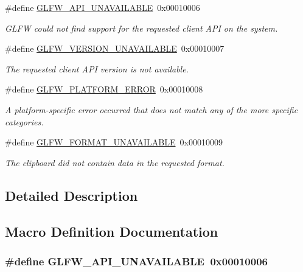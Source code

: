 \begin{DoxyCompactItemize}
\#define \hyperlink{group__errors_ga56882b290db23261cc6c053c40c2d08e}{G\-L\-F\-W\-\_\-\-A\-P\-I\-\_\-\-U\-N\-A\-V\-A\-I\-L\-A\-B\-L\-E}~0x00010006
\begin{DoxyCompactList}\small\item\em G\-L\-F\-W could not find support for the requested client A\-P\-I on the system. \end{DoxyCompactList}\item 
\#define \hyperlink{group__errors_gad16c5565b4a69f9c2a9ac2c0dbc89462}{G\-L\-F\-W\-\_\-\-V\-E\-R\-S\-I\-O\-N\-\_\-\-U\-N\-A\-V\-A\-I\-L\-A\-B\-L\-E}~0x00010007
\begin{DoxyCompactList}\small\item\em The requested client A\-P\-I version is not available. \end{DoxyCompactList}\item 
\#define \hyperlink{group__errors_gad44162d78100ea5e87cdd38426b8c7a1}{G\-L\-F\-W\-\_\-\-P\-L\-A\-T\-F\-O\-R\-M\-\_\-\-E\-R\-R\-O\-R}~0x00010008
\begin{DoxyCompactList}\small\item\em A platform-\/specific error occurred that does not match any of the more specific categories. \end{DoxyCompactList}\item 
\#define \hyperlink{group__errors_ga196e125ef261d94184e2b55c05762f14}{G\-L\-F\-W\-\_\-\-F\-O\-R\-M\-A\-T\-\_\-\-U\-N\-A\-V\-A\-I\-L\-A\-B\-L\-E}~0x00010009
\begin{DoxyCompactList}\small\item\em The clipboard did not contain data in the requested format. \end{DoxyCompactList}\end{DoxyCompactItemize}


\subsection{Detailed Description}


\subsection{Macro Definition Documentation}
\hypertarget{group__errors_ga56882b290db23261cc6c053c40c2d08e}{
\subsubsection[{G\-L\-F\-W\-\_\-\-A\-P\-I\-\_\-\-U\-N\-A\-V\-A\-I\-L\-A\-B\-L\-E}]{\setlength{\rightskip}{0pt plus 5cm}\#define G\-L\-F\-W\-\_\-\-A\-P\-I\-\_\-\-U\-N\-A\-V\-A\-I\-L\-A\-B\-L\-E~0x00010006}}\label{group__errors_ga56882b290db23261cc6c053c40c2d08e}



